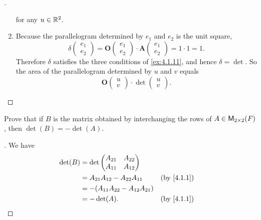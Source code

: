 \begin{proof}[]
\begin{enumerate}
\[		      \]
		      for any \(u \in \mathbb{R}^2\).
		\item Because the parallelogram determined by \(e_1\) and \(e_2\) is the unit square,
		      \[
			      \delta\begin{pmatrix}
				      e_1 \\
				      e_2
			      \end{pmatrix} = \mathbf{O}\begin{pmatrix}
				      e_1 \\
				      e_2
			      \end{pmatrix} \cdot \mathbf{A}\begin{pmatrix}
				      e_1 \\
				      e_2
			      \end{pmatrix} = 1 \cdot 1 = 1.
		      \]
		      Therefore \(\delta\) satisfies the three conditions of \cref{ex:4.1.11}, and hence \(\delta = \det\).
		      So the area of the parallelogram determined by \(u\) and \(v\) equals
		      \[
			      \mathbf{O}\begin{pmatrix}
				      u \\
				      v
			      \end{pmatrix} \cdot \det\begin{pmatrix}
				      u \\
				      v
			      \end{pmatrix}.
		      \]
	\end{enumerate}
\end{proof}

\exercisesection

\setcounter{ex}{4}
\begin{ex}\label{ex:4.1.5}
	Prove that if \(B\) is the matrix obtained by interchanging the rows of \(A \in \ms[2][2][\F]\), then \(\det(B) = -\det(A)\).
\end{ex}

\begin{proof}[]
	We have
	\begin{align*}
		\det(B) & = \det\begin{pmatrix}
			                A_{2 1} & A_{2 2} \\
			                A_{1 1} & A_{1 2}
		                \end{pmatrix}                                \\
		        & = A_{2 1} A_{1 2} - A_{2 2} A_{1 1}    &  & \by{4.1.1} \\
		        & = -(A_{1 1} A_{2 2} - A_{1 2} A_{2 1})                 \\
		        & = -\det(A).                            &  & \by{4.1.1}
	\end{align*}
\end{proof}

